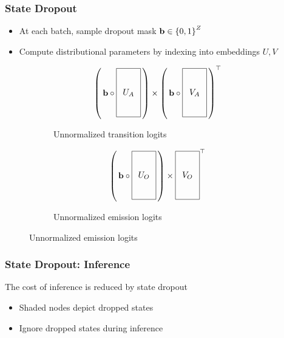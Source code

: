 \documentclass{beamer}
\begin{document}
\begin{frame}
\frametitle{State Dropout}
\begin{itemize}
\item At each batch, sample dropout mask $\mathbf{b} \in \left\{0,1\right\}^{Z}$
\item Compute distributional parameters by indexing into embeddings $U,V$
\end{itemize}

\begin{center}
\begin{figure}
\begin{subfigure}{0.49\textwidth}
\centering
\[
\left(\,
\mathbf{b} \circ \vcenter{\hbox{\begin{tikzpicture}[baseline=-0.5ex]
    \draw (0,0) rectangle (1,2) node[pos=.5] {$U_A$};
\end{tikzpicture}}}
\,\right)
\times
\left(\,
\mathbf{b} \circ
\vcenter{\hbox{\begin{tikzpicture}[baseline=-0.5ex]
    \draw (0,0) rectangle (1,2) node[pos=.5] {$V_A$};
\end{tikzpicture}}}
\,\right)^\top
\]
\caption{Unnormalized transition logits}
\end{subfigure}
\begin{subfigure}{0.49\textwidth}
\centering
\[
\left(\,
\mathbf{b} \circ \vcenter{\hbox{\begin{tikzpicture}[baseline=-0.5ex]
    \draw (0,0) rectangle (1,2) node[pos=.5] {$U_O$};
\end{tikzpicture}}}
\,\right)
\times
\vcenter{\hbox{\begin{tikzpicture}[baseline=-0.5ex]
    \draw (0,0) rectangle (1,2) node[pos=.5] {$V_O$};
\end{tikzpicture}}}
^\top
\]
\caption{Unnormalized emission logits}
\end{subfigure}
\end{figure}
\end{center}
\end{frame}

\begin{frame}
\frametitle{State Dropout: Inference}
The cost of inference is reduced by state dropout
\begin{center}
\resizebox{0.8\width}{0.8\height}{

}
\end{center}
\begin{itemize}
\item Shaded nodes depict dropped states
\item Ignore dropped states during inference
\end{itemize}
\end{frame}
\end{document}
